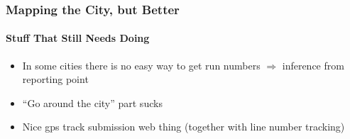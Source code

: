 \begin{frame}
  \frametitle{Mapping the City, but Better}
  \framesubtitle{Stuff That Still Needs Doing}
  \begin{itemize}
    \item In some cities there is no easy way to get run numbers $\Rightarrow$ inference from reporting point
    \item ``Go around the city'' part sucks
    \item Nice gps track submission web thing (together with line number tracking)
  \end{itemize}
\end{frame}
